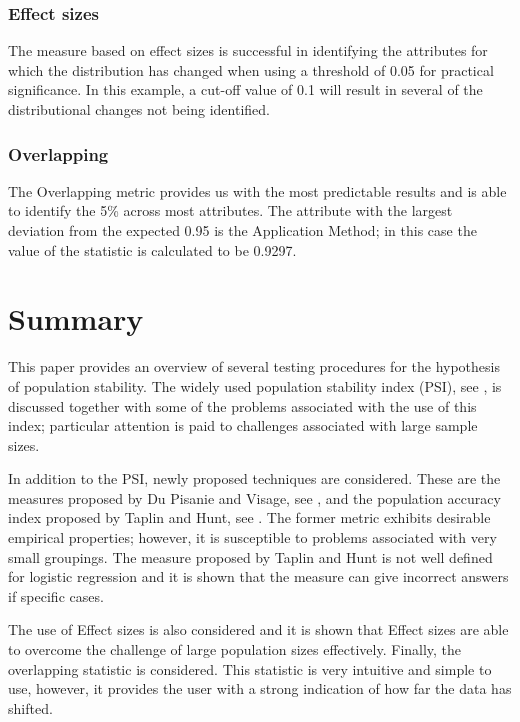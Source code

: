 \documentclass{article}
\theoremstyle{def}
\begin{document}
\subsubsection{Effect sizes}

The measure based on effect sizes is successful in identifying the attributes for which the distribution has changed when using a threshold of 0.05 for practical significance. In this example, a cut-off value of 0.1 will result in several of the distributional changes not being identified.

\subsubsection{Overlapping}

The Overlapping metric provides us with the most predictable results and is able to identify the 5\% across most attributes. The attribute with the largest deviation from the expected 0.95 is the Application Method; in this case the value of the statistic is calculated to be 0.9297. %

\section{Summary}


This paper provides an overview of several testing procedures for the hypothesis of population stability. The widely used population stability index (PSI), see \cite{SIDDIQI2006}, is discussed together with some of the problems associated with the use of this index; particular attention is paid to challenges associated with large sample sizes.

In addition to the PSI, newly proposed techniques are considered. These are the measures proposed by Du Pisanie and Visage, see \cite{DUPISANIEVISAGIE2020}, and the population accuracy index proposed by Taplin and Hunt, see \cite{TAPLINHUNT2019}. The former metric exhibits desirable empirical properties; however, it is susceptible to problems associated with very small groupings. The measure proposed by Taplin and Hunt is not well defined for logistic regression and it is shown that the measure can give incorrect answers if specific cases.

The use of Effect sizes is also considered and it is shown that Effect sizes are able to overcome the challenge of large population sizes effectively. Finally, the overlapping statistic is considered. This statistic is very intuitive and simple to use, however, it provides the user with a strong indication of how far the data has shifted.
\end{document}
